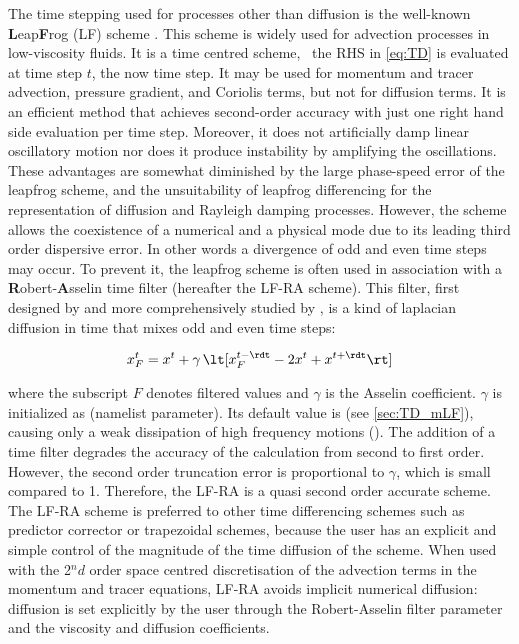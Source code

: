 \documentclass[../main/NEMO_manual]{subfiles}
\begin{document}
The time stepping used for processes other than diffusion is
the well-known \textbf{L}eap\textbf{F}rog (LF) scheme \citep{mesinger.arakawa_bk76}.
This scheme is widely used for advection processes in low-viscosity fluids.
It is a time centred scheme, \ie\ the RHS in \autoref{eq:TD} is evaluated at
time step $t$, the now time step.
It may be used for momentum and tracer advection, pressure gradient, and Coriolis terms,
but not for diffusion terms.
It is an efficient method that achieves second-order accuracy with
just one right hand side evaluation per time step.
Moreover, it does not artificially damp linear oscillatory motion
nor does it produce instability by amplifying the oscillations.
These advantages are somewhat diminished by the large phase-speed error of the leapfrog scheme,
and the unsuitability of leapfrog differencing for the representation of diffusion and
Rayleigh damping processes.
However, the scheme allows the coexistence of a numerical and a physical mode due to
its leading third order dispersive error.
In other words a divergence of odd and even time steps may occur.
To prevent it, the leapfrog scheme is often used in association with
a \textbf{R}obert-\textbf{A}sselin time filter (hereafter the LF-RA scheme).
This filter,
first designed by \citet{robert_JMSJ66} and more comprehensively studied by \citet{asselin_MWR72},
is a kind of laplacian diffusion in time that mixes odd and even time steps:

\begin{equation}
  \label{eq:TD_asselin}
  x_F^t = x^t + \gamma \, \lt[ x_F^{t - \rdt} - 2 x^t + x^{t + \rdt} \rt]
\end{equation}

where the subscript $F$ denotes filtered values and $\gamma$ is the Asselin coefficient.
$\gamma$ is initialized as  (namelist parameter).
Its default value is  (see \autoref{sec:TD_mLF}),
causing only a weak dissipation of high frequency motions (\citep{farge-coulombier_phd87}).
The addition of a time filter degrades the accuracy of the calculation from second to first order.
However, the second order truncation error is proportional to $\gamma$, which is small compared to 1.
Therefore, the LF-RA is a quasi second order accurate scheme.
The LF-RA scheme is preferred to other time differencing schemes such as
predictor corrector or trapezoidal schemes, because the user has an explicit and simple control of
the magnitude of the time diffusion of the scheme.
When used with the 2$^nd$ order space centred discretisation of the advection terms in
the momentum and tracer equations, LF-RA avoids implicit numerical diffusion:
diffusion is set explicitly by the user through the Robert-Asselin filter parameter and
the viscosity and diffusion coefficients.
\end{document}
